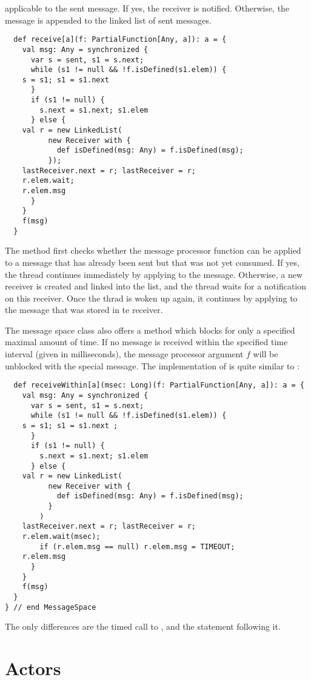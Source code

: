 \documentclass[11pt]{report}
\begin{document}
applicable to the sent message. If yes, the receiver is notified.
Otherwise, the message is appended to the linked list of sent messages.
\begin{verbatim}
  def receive[a](f: PartialFunction[Any, a]): a = {
    val msg: Any = synchronized {
      var s = sent, s1 = s.next;
      while (s1 != null && !f.isDefined(s1.elem)) {
	s = s1; s1 = s1.next
      }
      if (s1 != null) {
        s.next = s1.next; s1.elem
      } else {
	val r = new LinkedList(
          new Receiver with {
            def isDefined(msg: Any) = f.isDefined(msg);
          });
	lastReceiver.next = r; lastReceiver = r;
	r.elem.wait;
	r.elem.msg
      }
    }
    f(msg)
  }
\end{verbatim}
The \verb@receive@ method first checks whether the message processor function
\verb@f@ can be applied to a message that has already been sent but that
was not yet consumed. If yes, the thread continues immediately by
applying \verb@f@ to the message. Otherwise, a new receiver is created
and linked into the \verb@receivers@ list, and the thread waits for a
notification on this receiver. Once the thrad is woken up again, it
continues by applying \verb@f@ to the message that was stored in te receiver.

The message space class also offers a method \verb@receiveWithin@
which blocks for only a specified maximal amount of time.  If no
message is received within the specified time interval (given in
milliseconds), the message processor argument $f$ will be unblocked
with the special \verb@TIMEOUT@ message.  The implementation of
\verb@receiveWithin@ is quite similar to \verb@receive@:
\begin{verbatim}
  def receiveWithin[a](msec: Long)(f: PartialFunction[Any, a]): a = {
    val msg: Any = synchronized {
      var s = sent, s1 = s.next;
      while (s1 != null && !f.isDefined(s1.elem)) {
	s = s1; s1 = s1.next ;
      }
      if (s1 != null) {
        s.next = s1.next; s1.elem
      } else {
	val r = new LinkedList(
          new Receiver with {
            def isDefined(msg: Any) = f.isDefined(msg);
          }
        )
	lastReceiver.next = r; lastReceiver = r;
	r.elem.wait(msec);
        if (r.elem.msg == null) r.elem.msg = TIMEOUT;
	r.elem.msg
      }
    }
    f(msg)
  }
} // end MessageSpace
\end{verbatim}
The only differences are the timed call to \verb@wait@, and the
statement following it.

\section{Actors}
\label{sec:actors}
\end{document}
